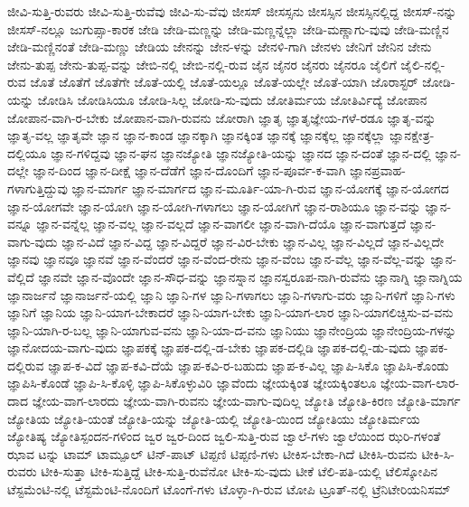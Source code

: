 {ಜೀವಿ-ಸುತ್ತಿ-ರುವರು
ಜೀವಿ-ಸುತ್ತಿ-ರುವೆವು
ಜೀವಿ-ಸು-ವೆವು
ಜೀಸಸ್
ಜೀಸಸ್ಸನು
ಜೀಸಸ್ಸಿನ
ಜೀಸಸ್ಸಿನಲ್ಲಿದ್ದ
ಜೀಸಸ್-ನನ್ನು
ಜೀಸಸ್-ನಲ್ಲೂ
ಜುಗುಪ್ಸಾ-ಕಾರಕ
ಜೇಡಿ
ಜೇಡಿ-ಮಣ್ಣನ್ನು
ಜೇಡಿ-ಮಣ್ಣನ್ನೆಲ್ಲಾ
ಜೇಡಿ-ಮಣ್ಣಾಗು-ವುವು
ಜೇಡಿ-ಮಣ್ಣಿನ
ಜೇಡಿ-ಮಣ್ಣಿನಂತೆ
ಜೇಡಿ-ಮಣ್ಣು
ಜೇಡಿಯ
ಜೇನನ್ನು
ಜೇನ-ಳನ್ನು
ಜೇನಳಿ-ಗಾಗಿ
ಜೇನಳು
ಜೇನಿಗೆ
ಜೇನಿನ
ಜೇನು
ಜೇನು-ತುಪ್ಪ
ಜೇನು-ತುಪ್ಪ-ವನ್ನು
ಜೇಬಿ-ನಲ್ಲಿ
ಜೇಬಿ-ನಲ್ಲಿ-ರುವ
ಜೈನ
ಜೈನರ
ಜೈನರು
ಜೈನರೂ
ಜೈಲಿಗೆ
ಜೈಲಿ-ನಲ್ಲಿ-ರುವ
ಜೊತೆ
ಜೊತೆಗೆ
ಜೊತೆಗೇ
ಜೊತೆ-ಯಲ್ಲಿ
ಜೊತೆ-ಯಲ್ಲೂ
ಜೊತೆ-ಯಲ್ಲೇ
ಜೊತೆ-ಯಾಗಿ
ಜೊರಾಸ್ಟರ್
ಜೋಡಿ-ಯನ್ನು
ಜೋಡಿಸಿ
ಜೋಡಿಸಿಯೂ
ಜೋಡಿ-ಸಿಲ್ಲ
ಜೋಡಿ-ಸು-ವುದು
ಜೋತಿರ್ಮಯ
ಜೋತಿರ್ವಿದ್ಯೆ
ಜೋಪಾನ
ಜೋಪಾನ-ವಾಗಿ-ರ-ಬೇಕು
ಜೋಪಾನ-ವಾಗಿ-ರುವನು
ಜೋರಾಗಿ
ಜ್ಞಾತೃ
ಜ್ಞಾತೃಜ್ಞೇಯ-ಗಳೆ-ರಡೂ
ಜ್ಞಾತೃ-ವನ್ನು
ಜ್ಞಾತೃ-ವಲ್ಲ
ಜ್ಞಾತೃವೇ
ಜ್ಞಾನ
ಜ್ಞಾನ-ಕಾಂಡ
ಜ್ಞಾನಕ್ಕಾಗಿ
ಜ್ಞಾನಕ್ಕಿಂತ
ಜ್ಞಾನಕ್ಕೆ
ಜ್ಞಾನಕ್ಕೆಲ್ಲ
ಜ್ಞಾನಕ್ಕೆಲ್ಲಾ
ಜ್ಞಾನಕ್ಷೇತ್ರ-ದಲ್ಲಿಯೂ
ಜ್ಞಾನ-ಗಳಿದ್ದವು
ಜ್ಞಾನ-ಘನ
ಜ್ಞಾನಜ್ಯೋತಿ
ಜ್ಞಾನಜ್ಯೋತಿ-ಯನ್ನು
ಜ್ಞಾನದ
ಜ್ಞಾನ-ದಂತೆ
ಜ್ಞಾನ-ದಲ್ಲಿ
ಜ್ಞಾನ-ದಲ್ಲೇ
ಜ್ಞಾನ-ದಿಂದ
ಜ್ಞಾನ-ದೀಕ್ಷೆ
ಜ್ಞಾನ-ದೆಡೆಗೆ
ಜ್ಞಾನ-ದೊಂದಿಗೆ
ಜ್ಞಾನ-ಪೂರ್ವ-ಕ-ವಾಗಿ
ಜ್ಞಾನಪ್ರವಾಹ-ಗಳಾಗುತ್ತಿದ್ದುವು
ಜ್ಞಾನ-ಮಾರ್ಗ
ಜ್ಞಾನ-ಮಾರ್ಗದ
ಜ್ಞಾನ-ಮೂರ್ತಿ-ಯಾ-ಗಿ-ರುವ
ಜ್ಞಾನ-ಯೋಗಕ್ಕೆ
ಜ್ಞಾನ-ಯೋಗದ
ಜ್ಞಾನ-ಯೋಗವೇ
ಜ್ಞಾನ-ಯೋಗಿ
ಜ್ಞಾನ-ಯೋಗಿ-ಗಳಾಗಲು
ಜ್ಞಾನ-ಯೋಗಿಗೆ
ಜ್ಞಾನ-ರಾಶಿಯೂ
ಜ್ಞಾನ-ವನ್ನು
ಜ್ಞಾನ-ವನ್ನೂ
ಜ್ಞಾನ-ವನ್ನೆಲ್ಲ
ಜ್ಞಾನ-ವಲ್ಲ
ಜ್ಞಾನ-ವಲ್ಲದೆ
ಜ್ಞಾನ-ವಾಗಲೀ
ಜ್ಞಾನ-ವಾಗಿ-ದೆಯೊ
ಜ್ಞಾನ-ವಾಗುತ್ತದೆ
ಜ್ಞಾನ-ವಾಗು-ವುದು
ಜ್ಞಾನ-ವಿದೆ
ಜ್ಞಾನ-ವಿದ್ದ
ಜ್ಞಾನ-ವಿದ್ದರೆ
ಜ್ಞಾನ-ವಿರ-ಬೇಕು
ಜ್ಞಾನ-ವಿಲ್ಲ
ಜ್ಞಾನ-ವಿಲ್ಲದೆ
ಜ್ಞಾನ-ವಿಲ್ಲದೇ
ಜ್ಞಾನವು
ಜ್ಞಾನವೂ
ಜ್ಞಾನವೆ
ಜ್ಞಾನ-ವೆಂದರೆ
ಜ್ಞಾನ-ವೆಂದ-ರೇನು
ಜ್ಞಾನ-ವೆಂಬ
ಜ್ಞಾನ-ವೆಲ್ಲ
ಜ್ಞಾನ-ವೆಲ್ಲ-ವನ್ನು
ಜ್ಞಾನ-ವೆಲ್ಲಿದೆ
ಜ್ಞಾನವೇ
ಜ್ಞಾನ-ವೊಂದೇ
ಜ್ಞಾನ-ಸೌಧ-ವನ್ನು
ಜ್ಞಾನಸ್ನಾನ
ಜ್ಞಾನಸ್ವರೂಪ-ನಾಗಿ-ರುವೆನು
ಜ್ಞಾನಾಗ್ನಿ
ಜ್ಞಾನಾಗ್ನಿಯ
ಜ್ಞಾನಾರ್ಜನೆ
ಜ್ಞಾನಾರ್ಜನೆ-ಯಲ್ಲಿ
ಜ್ಞಾನಿ
ಜ್ಞಾನಿ-ಗಳ
ಜ್ಞಾನಿ-ಗಳಾಗಲು
ಜ್ಞಾನಿ-ಗಳಾಗು-ವರು
ಜ್ಞಾನಿ-ಗಳಿಗೆ
ಜ್ಞಾನಿ-ಗಳು
ಜ್ಞಾನಿಗೆ
ಜ್ಞಾನಿಯ
ಜ್ಞಾನಿ-ಯಾಗ-ಬೇಕಾದರೆ
ಜ್ಞಾನಿ-ಯಾಗ-ಬೇಕು
ಜ್ಞಾನಿ-ಯಾಗ-ಲಾರ
ಜ್ಞಾನಿ-ಯಾಗಲಿಚ್ಚಿಸು-ವ-ವನು
ಜ್ಞಾನಿ-ಯಾಗಿ-ರ-ಬಲ್ಲ
ಜ್ಞಾನಿ-ಯಾಗುವ-ವನು
ಜ್ಞಾನಿ-ಯಾ-ದ-ವನು
ಜ್ಞಾನಿಯು
ಜ್ಞಾನೇಂದ್ರಿಯ
ಜ್ಞಾನೇಂದ್ರಿಯ-ಗಳನ್ನು
ಜ್ಞಾನೋದಯ-ವಾಗು-ವುದು
ಜ್ಞಾಪಕಕ್ಕೆ
ಜ್ಞಾಪಕ-ದಲ್ಲಿ-ಡ-ಬೇಕು
ಜ್ಞಾಪಕ-ದಲ್ಲಿಡಿ
ಜ್ಞಾಪಕ-ದಲ್ಲಿ-ಡು-ವುದು
ಜ್ಞಾಪಕ-ದಲ್ಲಿರುವ
ಜ್ಞಾಪ-ಕ-ವಿದೆ
ಜ್ಞಾಪ-ಕವಿ-ದೆಯೆ
ಜ್ಞಾಪ-ಕವಿ-ರ-ಬಹುದು
ಜ್ಞಾಪ-ಕ-ವಿಲ್ಲ
ಜ್ಞಾಪಿ-ಸಿಕೊ
ಜ್ಞಾಪಿಸಿ-ಕೊಂಡು
ಜ್ಞಾಪಿಸಿ-ಕೊಂಡೆ
ಜ್ಞಾಪಿ-ಸಿ-ಕೊಳ್ಳಿ
ಜ್ಞಾಪಿ-ಸಿಕೊಳ್ಳುವಿರಿ
ಜ್ಞಾವೆಂದು
ಜ್ಞೇಯಕ್ಕಿಂತ
ಜ್ಞೇಯಕ್ಕಿಂತಲೂ
ಜ್ಞೇಯ-ವಾಗ-ಲಾರ-ದಾದ
ಜ್ಞೇಯ-ವಾಗ-ಲಾರದು
ಜ್ಞೇಯ-ವಾಗಿ-ರುವನು
ಜ್ಞೇಯ-ವಾಗು-ವುದಿಲ್ಲ
ಜ್ಯೋತಿ
ಜ್ಯೋತಿ-ಕಿರಣ
ಜ್ಯೋತಿ-ಮಾರ್ಗ
ಜ್ಯೋತಿಯ
ಜ್ಯೋತಿ-ಯಂತೆ
ಜ್ಯೋತಿ-ಯನ್ನು
ಜ್ಯೋತಿ-ಯಲ್ಲಿ
ಜ್ಯೋತಿ-ಯಿಂದ
ಜ್ಯೋತಿಯು
ಜ್ಯೋತಿರ್ಮಯ
ಜ್ಯೋತಿಷ್ಯ
ಜ್ಯೋತಿಸ್ಪಂದನ-ಗಳಿಂದ
ಜ್ವರ
ಜ್ವರ-ದಿಂದ
ಜ್ವಲಿ-ಸುತ್ತಿ-ರುವ
ಜ್ವಾಲೆ-ಗಳು
ಜ್ವಾಲೆಯಿಂದ
ಝರಿ-ಗಳಂತೆ
ಝಾವ
ಟನ್ನು
ಟಾಮ್
ಟಾಮ್ಪೂಲ್
ಟಿನ್-ಪಾಟ್
ಟಿಪ್ಪಣಿ
ಟಿಪ್ಪಣಿ-ಗಳು
ಟೀಕಿಸ-ಬೇಕಾ-ಗಿದೆ
ಟೀಕಿಸಿ-ರುವನು
ಟೀಕಿ-ಸಿ-ರುವರು
ಟೀಕಿ-ಸುತ್ತಾ
ಟೀಕಿ-ಸುತ್ತಿದ್ದೆ
ಟೀಕಿ-ಸುತ್ತಿ-ರುವೆನೋ
ಟೀಕಿ-ಸು-ವುದು
ಟೀಕೆ
ಟೆಲಿ-ಪತಿ-ಯಲ್ಲಿ
ಟೆಲಿಸ್ಕೋಪಿನ
ಟೆಸ್ಟಮೆಂಟಿ-ನಲ್ಲಿ
ಟೆಸ್ಟಮೆಂಟಿ-ನೊಂದಿಗೆ
ಟೊಂಗೆ-ಗಳು
ಟೊಳ್ಳಾ-ಗಿ-ರುವ
ಟೋಪಿ
ಟ್ರೂತ್-ನಲ್ಲಿ
ಟ್ರೆನಿಟೇರಿಯನಿಸಮ್
}
